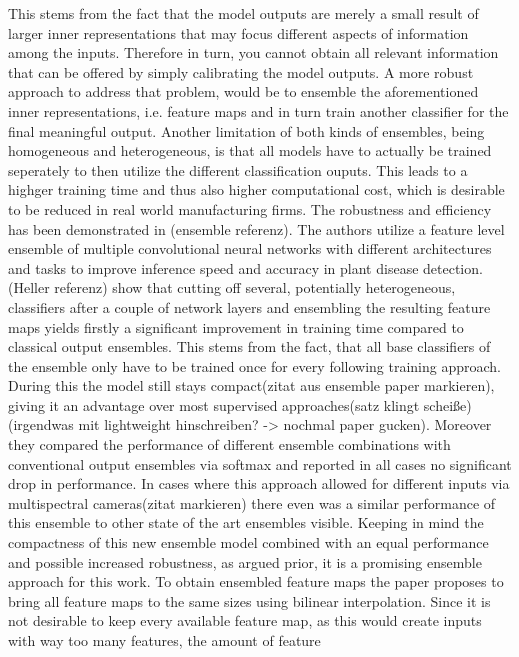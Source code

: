 This stems from the fact that the model outputs are merely a small result of larger inner representations that may focus different aspects 
of information among the inputs. Therefore in turn, you cannot obtain all relevant information that can be offered by simply calibrating the 
model outputs. A more robust approach to address that problem, would be to ensemble the aforementioned inner representations, i.e. feature maps 
and in turn train another classifier for the final meaningful output.
Another limitation of both kinds of ensembles, being homogeneous and heterogeneous, is that all models have to actually be trained 
seperately to then utilize the different classification ouputs. This leads to a highger training time and thus also higher computational 
cost, which is desirable to be reduced in real world manufacturing firms.
The robustness and efficiency has been demonstrated in \cite{EnsembleHeller2023} (ensemble referenz). The authors utilize a feature level ensemble of multiple 
convolutional neural networks with different architectures and tasks to improve inference speed and accuracy in plant disease detection.
(Heller referenz) show that cutting off several, potentially heterogeneous, classifiers after a couple of network layers and ensembling the 
resulting feature maps yields firstly a significant improvement in training time compared to classical output ensembles. This stems from 
the fact, that all base classifiers of the ensemble only have to be trained once for every following training approach. During this the 
model still stays compact(zitat aus ensemble paper markieren), giving it an advantage over most supervised approaches(satz klingt scheiße)(irgendwas mit 
lightweight hinschreiben? -> nochmal paper gucken). Moreover they compared the performance of different ensemble combinations with conventional 
output ensembles via softmax and reported in all cases no significant drop in performance. In cases where this approach allowed for 
different inputs via multispectral cameras(zitat markieren) there even was a similar performance of this ensemble to other state of the 
art ensembles visible. Keeping in mind the compactness of this new ensemble model combined with an equal performance and possible 
increased robustness, as argued prior, it is a promising ensemble approach for this work.
To obtain ensembled feature maps the paper proposes to bring all feature maps to the same sizes using bilinear interpolation. Since 
it is not desirable to keep every available feature map, as this would create inputs with way too many features, the amount of feature 
